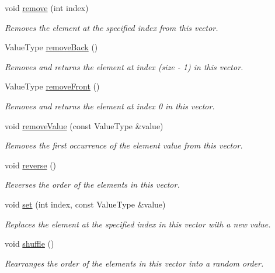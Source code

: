 \begin{DoxyCompactItemize}
void \mbox{\hyperlink{classVector_a2ad1aa316f278b2e9fa8121504749652}{remove}} (int index)
\begin{DoxyCompactList}\small\item\em Removes the element at the specified index from this vector. \end{DoxyCompactList}\item 
Value\+Type \mbox{\hyperlink{classVector_af7878e9c2f67e06cbae525e9fa77e38e}{remove\+Back}} ()
\begin{DoxyCompactList}\small\item\em Removes and returns the element at index (size -\/ 1) in this vector. \end{DoxyCompactList}\item 
Value\+Type \mbox{\hyperlink{classVector_a02453aa96e93c38ca4c1d176307c8a63}{remove\+Front}} ()
\begin{DoxyCompactList}\small\item\em Removes and returns the element at index 0 in this vector. \end{DoxyCompactList}\item 
void \mbox{\hyperlink{classVector_a10e8154a489093d2b1f20596342bcd78}{remove\+Value}} (const Value\+Type \&value)
\begin{DoxyCompactList}\small\item\em Removes the first occurrence of the element value from this vector. \end{DoxyCompactList}\item 
void \mbox{\hyperlink{classVector_a310c0bebc002158f5646a91d60e4dc89}{reverse}} ()
\begin{DoxyCompactList}\small\item\em Reverses the order of the elements in this vector. \end{DoxyCompactList}\item 
void \mbox{\hyperlink{classVector_a004ea6d6bc4a512ce4d52962727d5db2}{set}} (int index, const Value\+Type \&value)
\begin{DoxyCompactList}\small\item\em Replaces the element at the specified index in this vector with a new value. \end{DoxyCompactList}\item 
void \mbox{\hyperlink{classVector_a1905fe84eb39f020b32c58baf7a76758}{shuffle}} ()
\begin{DoxyCompactList}\small\item\em Rearranges the order of the elements in this vector into a random order. \end{DoxyCompactList}\item 

\end{DoxyCompactItemize}
